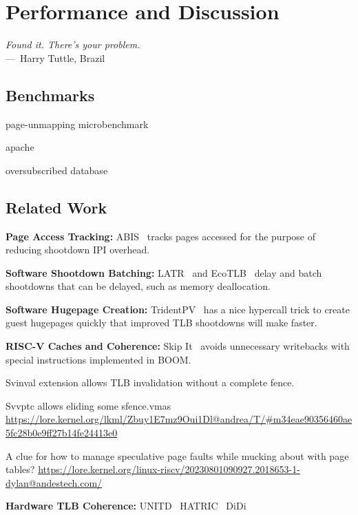 
\chapter{Performance and Discussion}
\label{ch:discussion}

\begin{epigraph}
	\emph{Found it. There's your problem.}\\
	---~Harry Tuttle, Brazil
\end{epigraph}

\section{Benchmarks}

page-unmapping microbenchmark

apache

oversubscribed database


\section{Related Work}
\textbf{Page Access Tracking:} ABIS~\cite{amit_optimizing_2017} tracks pages accessed for the purpose of reducing shootdown IPI overhead.

\textbf{Software Shootdown Batching:} LATR~\cite{kumar_latr_2018} and EcoTLB~\cite{maass_ecotlb_2020} delay and batch shootdowns that can be delayed, such as memory deallocation.

\textbf{Software Hugepage Creation:} TridentPV~\cite{ram_trident_2021} has a nice hypercall trick to create guest hugepages quickly that improved TLB shootdowns will make faster.

\textbf{RISC-V Caches and Coherence:} Skip It~\cite{anand_skip_2024} avoids unnecessary writebacks with special instructions implemented in BOOM.

Svinval extension allows TLB invalidation without a complete fence.

Svvptc allows eliding some sfence.vmas \url{https://lore.kernel.org/lkml/Zbuy1E7mz9Oui1Dl@andrea/T/#m34eae90356460ae5fc28b0e9ff27b14fe24413e0}

A clue for how to manage speculative page faults while mucking about with page tables? \url{https://lore.kernel.org/linux-riscv/20230801090927.2018653-1-dylan@andestech.com/}

\textbf{Hardware TLB Coherence:}
UNITD~\cite{romanescu_unified_2010}
HATRIC~\cite{yan_hardware_2017}
DiDi~\cite{villavieja_didi_2011}

